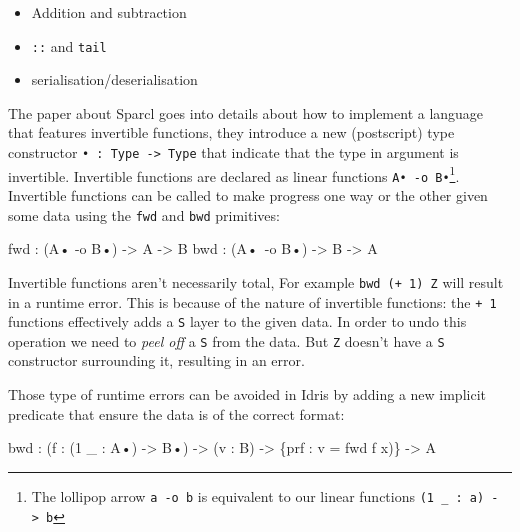 \documentclass[
]{article}
\newenvironment{Shaded}{}{}
\newcommand{\DataTypeTok}[1]{\textcolor[rgb]{0.56,0.13,0.00}{#1}}
\newcommand{\DecValTok}[1]{\textcolor[rgb]{0.25,0.63,0.44}{#1}}
\newcommand{\NormalTok}[1]{#1}
\newcommand{\OperatorTok}[1]{\textcolor[rgb]{0.40,0.40,0.40}{#1}}
\newcommand{\OtherTok}[1]{\textcolor[rgb]{0.00,0.44,0.13}{#1}}
\providecommand{\tightlist}{%
  \setlength{\itemsep}{0pt}\setlength{\parskip}{0pt}}
\begin{document}
\begin{itemize}
\tightlist
\item
  Addition and subtraction
\item
  \texttt{::} and \texttt{tail}
\item
  serialisation/deserialisation
\end{itemize}

The paper about Sparcl\cite{invertible_functions} goes into details
about how to implement a language that features invertible functions,
they introduce a new (postscript) type constructor
\texttt{•\ :\ Type\ -\textgreater{}\ Type} that indicate that the type
in argument is invertible. Invertible functions are declared as linear
functions \texttt{A•\ -o\ B•}\footnote{The lollipop arrow
  \texttt{a\ -o\ b} is equivalent to our linear functions
  \texttt{(1\ \_\ :\ a)\ -\textgreater{}\ b}}. Invertible functions can
be called to make progress one way or the other given some data using
the \texttt{fwd} and \texttt{bwd} primitives:

\begin{Shaded}
\begin{Highlighting}[]
\NormalTok{fwd }\OperatorTok{:}\NormalTok{ (}\DataTypeTok{A}\NormalTok{• }\OperatorTok{{-}}\NormalTok{o }\DataTypeTok{B}\NormalTok{•) }\OtherTok{{-}\textgreater{}} \DataTypeTok{A} \OtherTok{{-}\textgreater{}} \DataTypeTok{B}
\NormalTok{bwd }\OperatorTok{:}\NormalTok{ (}\DataTypeTok{A}\NormalTok{• }\OperatorTok{{-}}\NormalTok{o }\DataTypeTok{B}\NormalTok{•) }\OtherTok{{-}\textgreater{}} \DataTypeTok{B} \OtherTok{{-}\textgreater{}} \DataTypeTok{A}
\end{Highlighting}
\end{Shaded}

Invertible functions aren't necessarily total, For example
\texttt{bwd\ (+\ 1)\ Z} will result in a runtime error. This is because
of the nature of invertible functions: the \texttt{+\ 1} functions
effectively adds a \texttt{S} layer to the given data. In order to undo
this operation we need to \emph{peel off} a \texttt{S} from the data.
But \texttt{Z} doesn't have a \texttt{S} constructor surrounding it,
resulting in an error.

Those type of runtime errors can be avoided in Idris by adding a new
implicit predicate that ensure the data is of the correct format:

\begin{Shaded}
\begin{Highlighting}[]
\NormalTok{bwd }\OperatorTok{:}\NormalTok{ (f }\OperatorTok{:}\NormalTok{ (}\DecValTok{1}\NormalTok{ \_ }\OperatorTok{:} \DataTypeTok{A}\NormalTok{•) }\OtherTok{{-}\textgreater{}} \DataTypeTok{B}\NormalTok{•) }\OtherTok{{-}\textgreater{}}\NormalTok{ (v }\OperatorTok{:} \DataTypeTok{B}\NormalTok{) }\OtherTok{{-}\textgreater{}}\NormalTok{ \{prf }\OperatorTok{:}\NormalTok{ v }\OtherTok{=}\NormalTok{ fwd f x)\} }\OtherTok{{-}\textgreater{}} \DataTypeTok{A}
\end{Highlighting}
\end{Shaded}
\end{document}

